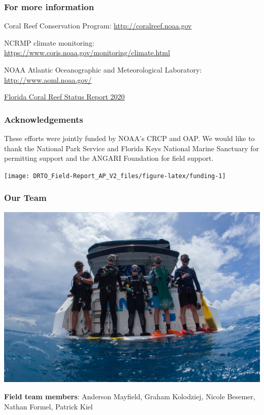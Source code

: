 \documentclass[]{article}
\begin{document}
\hypertarget{for-more-information}{%
\subsubsection{For more information}\label{for-more-information}}

Coral Reef Conservation Program: \url{http://coralreef.noaa.gov}

NCRMP climate monitoring:
\url{https://www.coris.noaa.gov/monitoring/climate.html}

NOAA Atlantic Oceanographic and Meteorological Laboratory:
\url{http://www.aoml.noaa.gov/}

\href{https://www.coris.noaa.gov/monitoring/status_report/docs/FL_508_compliant.pdf}{Florida
Coral Reef Status Report 2020}

\hypertarget{acknowledgements}{%
\subsubsection{Acknowledgements}\label{acknowledgements}}

These efforts were jointly funded by NOAA's CRCP and OAP. We would like
to thank the National Park Service and Florida Keys National Marine
Sanctuary for permitting support and the ANGARI Foundation for field
support.

\begin{flushleft}\texttt{[image: DRTO\_Field-Report\_AP\_V2\_files/figure-latex/funding-1]} \end{flushleft}

\hypertarget{our-team}{%
\subsubsection{Our Team}\label{our-team}}

\begin{flushleft}\includegraphics[width=0.5\linewidth]{Data/Fieldteam} \end{flushleft}

\textbf{Field team members}: Anderson Mayfield, Graham Kolodziej, Nicole
Besemer, Nathan Formel, Patrick Kiel
\end{document}
